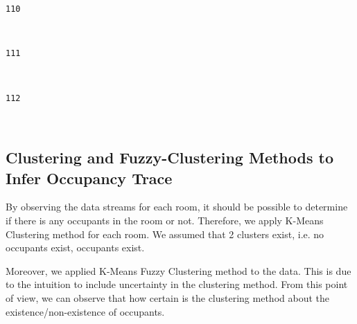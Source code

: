 \documentclass[11pt]{article}
\begin{document}
    \begin{Verbatim}[commandchars=\\\{\}]
110

    \end{Verbatim}

    \begin{center}
    \end{center}
    { \hspace*{\fill} \\}
    
    \begin{Verbatim}[commandchars=\\\{\}]
111

    \end{Verbatim}

    \begin{center}
    \end{center}
    { \hspace*{\fill} \\}
    
    \begin{Verbatim}[commandchars=\\\{\}]
112

    \end{Verbatim}

    \begin{center}
    \end{center}
    { \hspace*{\fill} \\}
    
    \subsection{Clustering and Fuzzy-Clustering Methods to Infer Occupancy
Trace}\label{clustering-and-fuzzy-clustering-methods-to-infer-occupancy-trace}

By observing the data streams for each room, it should be possible to
determine if there is any occupants in the room or not. Therefore, we
apply K-Means Clustering method for each room. We assumed that 2
clusters exist, i.e. no occupants exist, occupants exist.

Moreover, we applied K-Means Fuzzy Clustering method to the data. This
is due to the intuition to include uncertainty in the clustering method.
From this point of view, we can observe that how certain is the
clustering method about the existence/non-existence of occupants.
\end{document}
